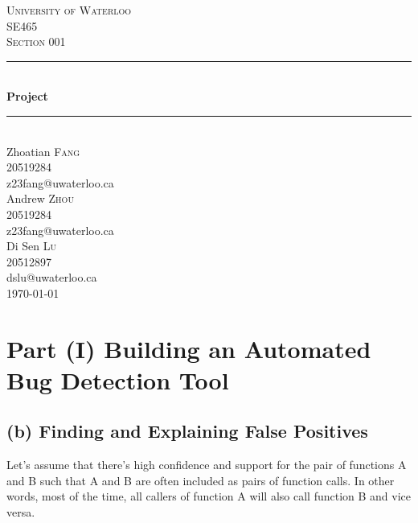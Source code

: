 \documentclass{article}
\begin{document}

\begin{titlepage}

\newcommand{\HRule}{\rule{\linewidth}{0.5mm}}

\center

\textsc{\huge University of Waterloo}\\[2cm]
\textsc{\LARGE SE465}\\[1cm] 
\textsc{\Large Section 001}\\[1cm] 

\HRule \\[0.5cm]
{ \Huge \bfseries Project}\\[0.5cm] 
\HRule \\[0.5cm]
 
\LARGE Zhoatian \textsc{Fang} \\  [0.5cm]
\Large 20519284 \\  [0.5cm]
z23fang@uwaterloo.ca \\ [1.5cm]

\LARGE Andrew \textsc{Zhou} \\  [0.5cm]
\Large 20519284 \\  [0.5cm]
z23fang@uwaterloo.ca \\ [1.5cm]

\LARGE Di Sen \textsc{Lu} \\  [0.5cm]
\Large 20512897 \\  [0.5cm]
dslu@uwaterloo.ca \\ [1.5cm]

{\Large \today}\\

\vfill 

\end{titlepage}

\section*{Part (I) Building an Automated Bug Detection Tool}

\subsection*{(b) Finding and Explaining False Positives}
Let's assume that there's high confidence and support for the pair of functions A and B such that A and B are often included as pairs of function calls. In other words, most of the time, all callers of function A will also call function B and vice versa. \\
\end{document}
